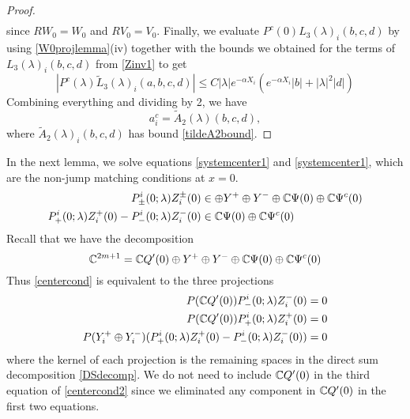 \documentclass[thesis.tex]{subfiles}
\begin{document}
\begin{lemma}
\begin{proof}
\begin{align*}
\end{align*}
since $R W_0 = W_0$ and $RV_0 = V_0$. Finally, we evaluate $P^c(0)L_3(\lambda)_i(b,c,d)$ by using \cref{W0projlemma}(iv) together with the bounds we obtained for the terms of $L_3(\lambda)_i(b,c,d)$ from \cref{Zinv1} to get 
\begin{equation*}
|P^c(\lambda)\tilde{L}_3(\lambda)_i(a,b,c,d)| \leq C |\lambda| e^{-\alpha X_i} \left( e^{-\alpha X_i} |b| + |\lambda|^2 |d| \right)
\end{equation*}
Combining everything and dividing by 2, we have 
\begin{equation*}
a_i^c = \tilde{A}_2(\lambda)(b, c, d),
\end{equation*}
where $\tilde{A}_2(\lambda)_i(b, c, d)$ has bound \cref{tildeA2bound}.
\end{proof}
\end{lemma}

In the next lemma, we solve equations \cref{systemcenter1} and \cref{systemcenter1}, which are the non-jump matching conditions at $x = 0$.
\begin{equation}\label{centercond}
\begin{aligned}
P^i_\pm(0; \lambda) Z_i^\pm(0) &\in \oplus Y^+ \oplus Y^- \oplus \mathbb{C} \Psi(0) \oplus \mathbb{C} \Psi^c(0) \\
P^i_+(0; \lambda) Z_i^+(0) - P^i_-(0; \lambda) Z_i^-(0) &\in \mathbb{C} \Psi(0) \oplus \mathbb{C} \Psi^c(0)
\end{aligned}
\end{equation}
Recall that we have the decomposition
\begin{equation}\label{DSdecomp}
\mathbb{C}^{2m+1} = \mathbb{C} Q'(0) \oplus Y^+ \oplus Y^- \oplus \mathbb{C} \Psi(0) \oplus \mathbb{C} \Psi^c(0)
\end{equation}
Thus \eqref{centercond} is equivalent to the three projections
\begin{equation}\label{centercond2}
\begin{aligned}
P(\mathbb{C} Q'(0) ) P^i_-(0; \lambda) Z_i^-(0) &= 0 \\
P(\mathbb{C} Q'(0) ) P^i_+(0; \lambda) Z_i^+(0) &= 0 \\
P(Y_i^+ \oplus Y_i^-) ( P^i_+(0; \lambda) Z_i^+(0) - P^i_-(0; \lambda) Z_i^-(0) ) &= 0
\end{aligned}
\end{equation}
where the kernel of each projection is the remaining spaces in the direct sum decomposition \eqref{DSdecomp}. We do not need to include $\mathbb{C} Q'(0)$ in the third equation of \eqref{centercond2} since we eliminated any component in $\mathbb{C} Q'(0)$ in the first two equations.
\end{document}
